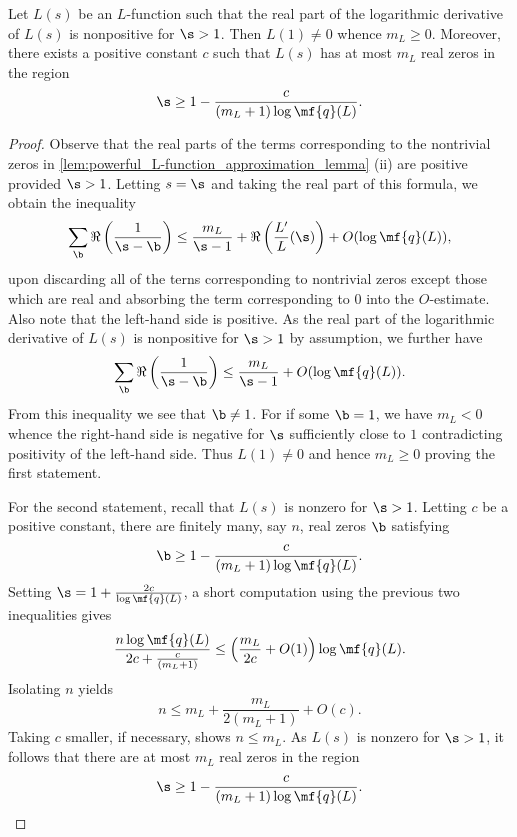 \documentclass[12pt]{article}
\begin{document}
      \begin{lemma}\label{lem:non-vanshing_at_1_lemma}
        Let \(L(s)\) be an \(L\)-function such that the real part of the logarithmic derivative of \(L(s)\) is nonpositive for \(\s > 1\). Then \(L(1) \neq 0\) whence \(m_{L} \ge 0\). Moreover, there exists a positive constant \(c\) such that \(L(s)\) has at most \(m_{L}\) real zeros in the region
        \[
          \s \ge 1-\frac{c}{(m_{L}+1)\log{\mf{q}(L)}}.
        \]
      \end{lemma}
      \begin{proof}
        Observe that the real parts of the terms corresponding to the nontrivial zeros in \cref{lem:powerful_L-function_approximation_lemma} (ii) are positive provided \(\s > 1\). Letting \(s = \s\) and taking the real part of this formula, we obtain the inequality
        \[
          \sum_{\b}\Re\left(\frac{1}{\s-\b}\right) \le \frac{m_{L}}{\s-1}+\Re\left(\frac{L'}{L}(\s)\right)+O(\log{\mf{q}(L)}),
        \]
        upon discarding all of the terns corresponding to nontrivial zeros except those which are real and absorbing the term corresponding to \(0\) into the \(O\)-estimate. Also note that the left-hand side is positive. As the real part of the logarithmic derivative of \(L(s)\) is nonpositive for \(\s > 1\) by assumption, we further have
        \[
          \sum_{\b}\Re\left(\frac{1}{\s-\b}\right) \le \frac{m_{L}}{\s-1}+O(\log{\mf{q}(L)}).
        \]
        From this inequality we see that \(\b \neq 1\). For if some \(\b = 1\), we have \(m_{L} < 0\) whence the right-hand side is negative for \(\s\) sufficiently close to \(1\) contradicting positivity of the left-hand side. Thus \(L(1) \neq 0\) and hence \(m_{L} \ge 0\) proving the first statement.
        
        For the second statement, recall that \(L(s)\) is nonzero for \(\s > 1\). Letting \(c\) be a positive constant, there are finitely many, say \(n\), real zeros \(\b\) satisfying
        \[
          \b \ge 1-\frac{c}{(m_{L}+1)\log{\mf{q}(L)}}.
        \]
        Setting \(\s = 1+\frac{2c}{\log{\mf{q}(L)}}\), a short computation using the previous two inequalities gives
        \[
          \frac{n\log{\mf{q}(L)}}{2c+\frac{c}{(m_{L}+1)}} \le \left(\frac{m_{L}}{2c}+O(1)\right)\log{\mf{q}(L)}.
        \]
        Isolating \(n\) yields
        \[
          n \le m_{L}+\frac{m_{L}}{2(m_{L}+1)}+O(c).
        \]
        Taking \(c\) smaller, if necessary, shows \(n \le m_{L}\). As \(L(s)\) is nonzero for \(\s > 1\), it follows that there are at most \(m_{L}\) real zeros in the region
        \[
          \s \ge 1-\frac{c}{(m_{L}+1)\log{\mf{q}(L)}}.
        \]
      \end{proof}
\end{document}
